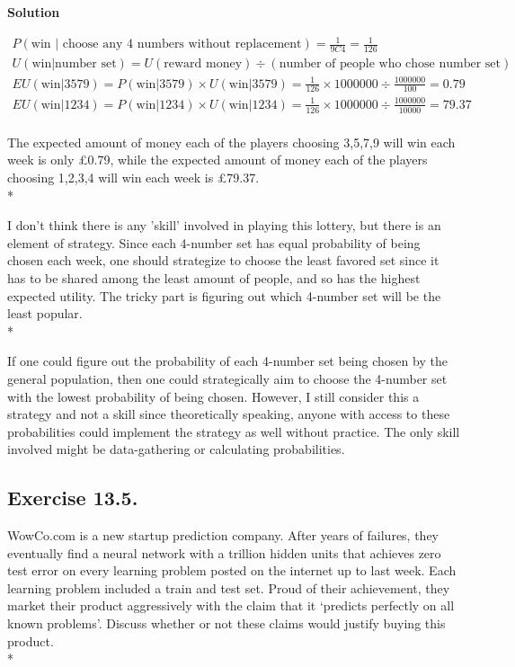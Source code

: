 \documentclass[11pt]{article}
\def\br{\hspace*{\fill} \\* }
\begin{document}
    \textbf{Solution}
    
    \begin{gather*}
    P(\text{win | choose any 4 numbers without replacement}) =
\frac{1}{9C4} = \frac{1}{126}\\
U(\text{win|number set}) = U(\text{reward money}) \div (\text{number of people who chose number set})\\
EU(\text{win|}3579) = P(\text{win}|3579) \times U(\text{win}|3579) = \frac{1}{126} \times 1000000 \div \frac{1000000}{100} = 0.79\\
EU(\text{win|}1234) = P(\text{win}|1234) \times U(\text{win}|1234) = \frac{1}{126} \times 1000000 \div \frac{1000000}{10000} = 79.37\\
    \end{gather*}



The expected amount of money each of the players choosing 3,5,7,9 will
win each week is only £0.79, while the expected amount of money each of
the players choosing 1,2,3,4 will win each week is £79.37.\br

I don't think there is any 'skill' involved in playing this lottery, but
there is an element of strategy. Since each 4-number set has equal
probability of being chosen each week, one should strategize to choose
the least favored set since it has to be shared among the least amount
of people, and so has the highest expected utility. The tricky part is
figuring out which 4-number set will be the least popular.\br

If one could figure out the probability of each 4-number set being
chosen by the general population, then one could strategically aim to
choose the 4-number set with the lowest probability of being chosen.
However, I still consider this a strategy and not a skill since
theoretically speaking, anyone with access to these probabilities could
implement the strategy as well without practice. The only skill involved
might be data-gathering or calculating probabilities.
\pagebreak
    \subsection*{Exercise 13.5.}

WowCo.com is a new startup prediction company. After years of failures,
they eventually find a neural network with a trillion hidden units that
achieves zero test error on every learning problem posted on the
internet up to last week. Each learning problem included a train and
test set. Proud of their achievement, they market their product
aggressively with the claim that it `predicts perfectly on all known
problems'. Discuss whether or not these claims would justify buying this
product.\br
\end{document}
